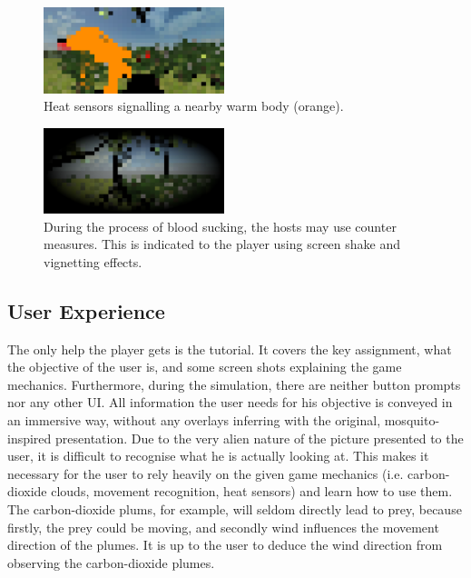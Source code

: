 \documentclass{sig-alternate-05-2015}
\begin{document}
\begin{figure}[ht!]
\includegraphics[width=0.47\textwidth]{Figures/heat.png}
\caption{Heat sensors signalling a nearby warm body (orange).}
\label{fig:heat}
\end{figure}



\begin{figure}[ht!]
\includegraphics[width=0.47\textwidth]{Figures/danger.png}
\caption{During the process of blood sucking, the hosts may use counter measures. This is indicated to the player using screen shake and vignetting effects.}
\label{fig:danger}
\end{figure}



\subsection{User Experience}
\label{sec:ux}
\noindent
The only help the player gets is the tutorial. It covers the key assignment, what the objective of the user is, and some screen shots explaining the game mechanics. Furthermore, during the simulation, there are neither button prompts nor any other UI. All information the user needs for his objective is conveyed in an immersive way, without any overlays inferring with the original, mosquito-inspired presentation. 
Due to the very alien nature of the picture presented to the user, it is difficult to recognise what he is actually looking at. This makes it necessary for the user to rely heavily on the given game mechanics (i.e. carbon-dioxide clouds, movement recognition, heat sensors) and learn how to use them. The carbon-dioxide plums, for example, will seldom directly lead to prey, because firstly, the prey could be moving, and secondly wind influences the movement direction of the plumes. It is up to the user to deduce the wind direction from observing the carbon-dioxide plumes.
\end{document}
